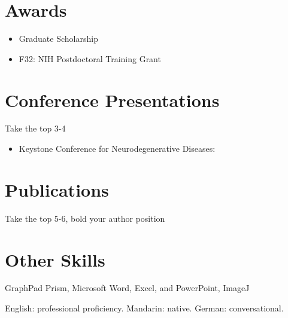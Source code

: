 \documentclass{article}
\begin{document}
\section{Awards}
\begin{itemize}
\item Graduate Scholarship 
\item F32: NIH Postdoctoral Training Grant
\end{itemize}

\section{Conference Presentations }

Take the top 3-4
\begin{itemize}
\item Keystone Conference for Neurodegenerative Diseases:
\end{itemize}

 
\section{Publications}
Take the top 5-6, bold your author position 


\section{Other Skills}
\begin{description}[widest=Langauges]
\item[Software]	GraphPad Prism, Microsoft Word, Excel, and PowerPoint, ImageJ
\item[Languages]	English: professional proficiency.  Mandarin: native.  German: conversational.
\end{description}
\end{document}
